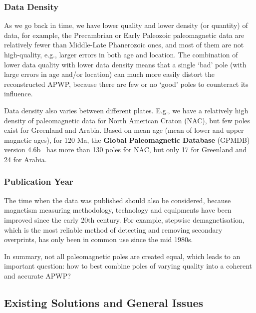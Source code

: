 \subsubsection{Data Density}

As we go back in time, we have lower quality and lower density (or quantity) of
data, for example, the Precambrian or Early Paleozoic paleomagnetic data are
relatively fewer than Middle-Late Phanerozoic ones, and most of them are not
high-quality, e.g., larger errors in both age and location. The combination of
lower data quality with lower data density means that a single `bad' pole (with
large errors in age and/or location) can much more easily distort the
reconstructed APWP, because there are few or no `good' poles to counteract its
influence.

Data density also varies between different plates. E.g., we have a relatively
high density of paleomagnetic data for North American Craton (NAC), but few
poles exist for Greenland and Arabia. Based on mean age (mean of lower and upper
magnetic ages), for 120 Ma, the \textbf{Global Paleomagnetic
Database} (GPMDB) version 4.6b~\cite{P05} has more than 130 poles for NAC, but
only 17 for Greenland and 24 for Arabia.

\subsubsection{Publication Year}

The time when the data was published should also be considered, because
magnetism measuring methodology, technology and equipments have been improved
since the early 20th century. For example, stepwise demagnetisation, which is
the most reliable method of detecting and removing secondary overprints, has
only been in common use since the mid 1980s.

In summary, not all paleomagnetic poles are created equal, which leads to an
important question: how to best combine poles of varying quality into a coherent
and accurate APWP\@?

\subsection{Existing Solutions and General Issues}

